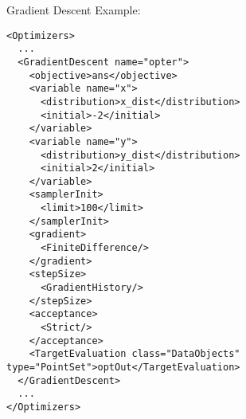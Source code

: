 \hspace{24pt}
Gradient Descent Example:
\begin{lstlisting}[style=XML]
<Optimizers>
  ...
  <GradientDescent name="opter">
    <objective>ans</objective>
    <variable name="x">
      <distribution>x_dist</distribution>
      <initial>-2</initial>
    </variable>
    <variable name="y">
      <distribution>y_dist</distribution>
      <initial>2</initial>
    </variable>
    <samplerInit>
      <limit>100</limit>
    </samplerInit>
    <gradient>
      <FiniteDifference/>
    </gradient>
    <stepSize>
      <GradientHistory/>
    </stepSize>
    <acceptance>
      <Strict/>
    </acceptance>
    <TargetEvaluation class="DataObjects" type="PointSet">optOut</TargetEvaluation>
  </GradientDescent>
  ...
</Optimizers>
\end{lstlisting}



